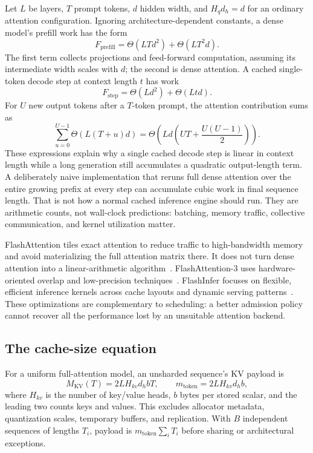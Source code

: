 Let $L$ be layers, $T$ prompt tokens, $d$ hidden width, and $H_qd_h=d$ for an
ordinary attention configuration. Ignoring architecture-dependent constants,
a dense model's prefill work has the form
\begin{equation}
 F_{\mathrm{prefill}}=\Theta(LTd^2)+\Theta(LT^2d).
 \label{eq:prefill}
\end{equation}
The first term collects projections and feed-forward computation, assuming its
intermediate width scales with $d$; the second is dense attention. A cached
single-token decode step at context length $t$ has work
\begin{equation}
 F_{\mathrm{step}}=\Theta(Ld^2)+\Theta(Ltd).
\end{equation}
For $U$ new output tokens after a $T$-token prompt, the attention contribution
sums as
\begin{equation}
 \sum_{u=0}^{U-1}\Theta(L(T+u)d)
 =\Theta\!\left(Ld\left(UT+\frac{U(U-1)}{2}\right)\right).
 \label{eq:decode}
\end{equation}
These expressions explain why a single cached decode step is linear in context
length while a long generation still accumulates a quadratic output-length
term. A deliberately naive implementation that reruns full dense attention over
the entire growing prefix at every step can accumulate cubic work in final
sequence length. That is not how a normal cached inference engine should run.
They are arithmetic counts, not wall-clock predictions: batching, memory
traffic, collective communication, and kernel utilization matter.

FlashAttention tiles exact attention to reduce traffic to high-bandwidth memory
and avoid materializing the full attention matrix there. It does not turn dense
attention into a linear-arithmetic algorithm~\cite{flash}. FlashAttention-3
uses hardware-oriented overlap and low-precision techniques~\cite{flash3}.
FlashInfer focuses on flexible, efficient inference kernels across cache
layouts and dynamic serving patterns~\cite{flashinfer}. These optimizations are
complementary to scheduling: a better admission policy cannot recover all the
performance lost by an unsuitable attention backend.

\subsection{The cache-size equation}
For a uniform full-attention model, an unsharded sequence's KV payload is
\begin{equation}
 M_{\mathrm{KV}}(T)=2LH_{kv}d_hbT,
 \qquad m_{\mathrm{token}}=2LH_{kv}d_hb,
 \label{eq:kvbytes}
\end{equation}
where $H_{kv}$ is the number of key/value heads, $b$ bytes per stored scalar,
and the leading two counts keys and values. This excludes allocator metadata,
quantization scales, temporary buffers, and replication. With $B$ independent
sequences of lengths $T_i$, payload is $m_{\mathrm{token}}\sum_iT_i$ before
sharing or architectural exceptions.

